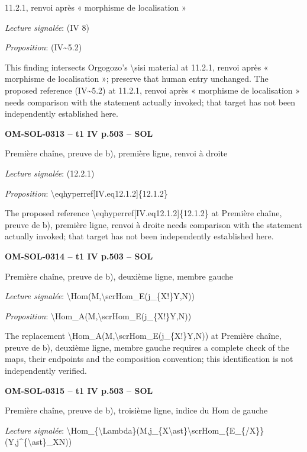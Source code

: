 11.2.1, renvoi après « morphisme de localisation »\par
\emph{Lecture signalée}: (IV 8)\par
\emph{Proposition}: (IV\textasciitilde{}5.2)\par
This finding intersects Orgogozo's \textbackslash{}sisi material at 11.2.1, renvoi après « morphisme de localisation »; preserve that human entry unchanged. The proposed reference (IV\textasciitilde{}5.2) at 11.2.1, renvoi après « morphisme de localisation » needs comparison with the statement actually invoked; that target has not been independently established here.\par
\par\noindent\textbf{OM-SOL-0313 -- t1 IV p.503 -- SOL}\par
Première chaîne, preuve de b), première ligne, renvoi à droite\par
\emph{Lecture signalée}: (12.2.1)\par
\emph{Proposition}: \textbackslash{}eqhyperref[IV.eq12.1.2]\{12.1.2\}\par
The proposed reference \textbackslash{}eqhyperref[IV.eq12.1.2]\{12.1.2\} at Première chaîne, preuve de b), première ligne, renvoi à droite needs comparison with the statement actually invoked; that target has not been independently established here.\par
\par\noindent\textbf{OM-SOL-0314 -- t1 IV p.503 -- SOL}\par
Première chaîne, preuve de b), deuxième ligne, membre gauche\par
\emph{Lecture signalée}: \textbackslash{}Hom(M,\textbackslash{}scrHom\_E(j\_\{X!\}Y,N))\par
\emph{Proposition}: \textbackslash{}Hom\_A(M,\textbackslash{}scrHom\_E(j\_\{X!\}Y,N))\par
The replacement \textbackslash{}Hom\_A(M,\textbackslash{}scrHom\_E(j\_\{X!\}Y,N)) at Première chaîne, preuve de b), deuxième ligne, membre gauche requires a complete check of the maps, their endpoints and the composition convention; this identification is not independently verified.\par
\par\noindent\textbf{OM-SOL-0315 -- t1 IV p.503 -- SOL}\par
Première chaîne, preuve de b), troisième ligne, indice du Hom de gauche\par
\emph{Lecture signalée}: \textbackslash{}Hom\_\{\textbackslash{}Lambda\}(M,j\_\{X\textbackslash{}ast\}\textbackslash{}scrHom\_\{E\_\{/X\}\}(Y,j\textasciicircum{}\{\textbackslash{}ast\}\_XN))\par
